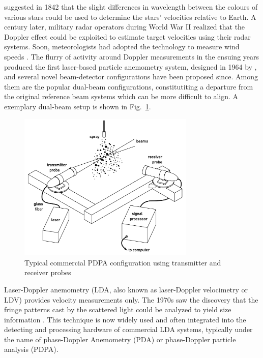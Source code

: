 \documentclass[11.5pt,oneside]{book}
\newcommand*{\figref}[1]{Fig.~\ref{#1}}
\begin{document}
\citet{Doppler42} suggested in 1842 that the slight differences in wavelength between
the colours of various stars could be used to determine the stars' velocities relative to
Earth. A century later, military radar operators during World War II realized that the Doppler
effect could be exploited to estimate target velocities using their radar
systems. Soon, meteorologists had adopted the technology to measure wind speeds
\cite{Whiton98}. The flurry of activity around Doppler measurements in the
ensuing years produced the first laser-based particle anemometry system,
designed in 1964 by \citet{Yeh64}, and several novel beam-detector
configurations have been proposed since. Among them are the popular dual-beam
configurations, constitutiting a departure from the original reference beam
systems which can be more difficult to align. A exemplary dual-beam setup is
shown in \figref{fig:pdpa-setup}.

\begin{figure}
    \centering
    \includegraphics[width=0.75\textwidth]{img/setup/pdpa_setup.pdf}
    \caption{Typical commercial PDPA configuration using transmitter and
        receiver probes \label{fig:pdpa-setup}}
\end{figure}

Laser-Doppler anemometry (LDA, also known as laser-Doppler velocimetry or LDV)
provides velocity measurements only. The 1970s saw the discovery that the fringe
patterns cast by the scattered light could be analyzed to yield size information
\cite{Durst76, Wigley78}. This technique is now widely used and often
integrated into the detecting and processing hardware of commercial LDA systems,
typically under the name of phase-Doppler Anemometry (PDA) or phase-Doppler
particle analysis (PDPA).
\end{document}
